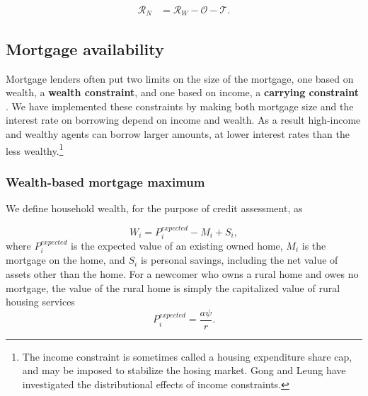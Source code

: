 \begin{align}
\mathcal{R}_N &= \mathcal{R}_W - \mathcal{O} - \mathcal{T}.
\end{align}

 {\color{black}

\subsection{Mortgage availability} \label{sec:mortgage-availability}
Mortgage lenders often put two limits on the size of the mortgage, one based on wealth, a \textbf{wealth constraint}, and one based on income, a \textbf{carrying constraint} \cite{GET_REF_CHSP}. We have implemented these constraints by making both mortgage size and the interest rate on borrowing depend on income and wealth. As a result high-income and  wealthy agents can borrow larger amounts, at lower interest rates than the less wealthy.\footnote{The income constraint is sometimes called a housing expenditure share cap, and may be imposed to stabilize the hosing market. Gong and Leung \cite{yifangongDoesSpaceMatter2003} have investigated the distributional effects of income constraints.} %


\subsubsection{Wealth-based mortgage maximum} 
We define household wealth, for the purpose of credit assessment, as

\begin{equation} 
W_i= P^{expected}_i - M_i  +S_i, 
\end{equation}
where $P^{expected}_i$ is the expected value of an existing owned home, $M_i$ is the mortgage on the home, and $S_i$ is personal savings, including the net value of assets other than the home. %
For a newcomer who owns a rural home and owes no mortgage, the value of the rural home is simply the capitalized value of rural housing services
\begin{equation} 
P^{expected}_i = \frac{a\psi}{r}.
\end{equation}


}
